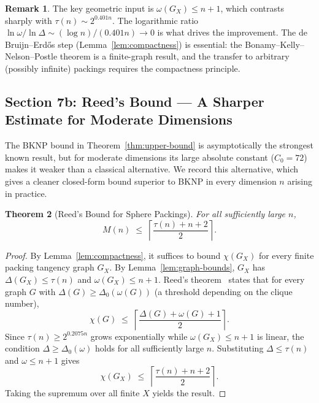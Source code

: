 \documentclass{article}
\newtheorem{theorem}{Theorem}[section]
\theoremstyle{definition}
\newtheorem{remark}[theorem]{Remark}
\begin{document}
\begin{remark}
The key geometric input is $\omega(G_X)\le n+1$, which contrasts sharply with $\tau(n)\sim 2^{0.401n}$.  The logarithmic ratio $\ln\omega/\ln\Delta\sim (\log n)/(0.401n)\to 0$ is what drives the improvement.  The de Bruijn--Erd\H{o}s step (Lemma~\ref{lem:compactness}) is essential: the Bonamy--Kelly--Nelson--Postle theorem is a finite-graph result, and the transfer to arbitrary (possibly infinite) packings requires the compactness principle.
\end{remark}

\subsection*{Section 7b: Reed's Bound — A Sharper Estimate for Moderate Dimensions}

The BKNP bound in Theorem~\ref{thm:upper-bound} is asymptotically the strongest known result, but for moderate dimensions its large absolute constant ($C_0 = 72$) makes it weaker than a classical alternative.  We record this alternative, which gives a cleaner closed-form bound superior to BKNP in every dimension $n$ arising in practice.

\begin{theorem}[Reed's Bound for Sphere Packings]\label{thm:reed}
For all sufficiently large $n$,
\[
  M(n) \;\le\; \left\lceil\frac{\tau(n)+n+2}{2}\right\rceil.
\]
\end{theorem}

\begin{proof}
By Lemma~\ref{lem:compactness}, it suffices to bound $\chi(G_X)$ for every finite packing tangency graph $G_X$.  By Lemma~\ref{lem:graph-bounds}, $G_X$ has $\Delta(G_X)\le\tau(n)$ and $\omega(G_X)\le n+1$.  Reed's theorem~\cite{Reed1998} states that for every graph $G$ with $\Delta(G)\ge\Delta_0(\omega(G))$ (a threshold depending on the clique number),
\[
  \chi(G)\;\le\;\left\lceil\frac{\Delta(G)+\omega(G)+1}{2}\right\rceil.
\]
Since $\tau(n)\ge 2^{0.2075n}$ grows exponentially while $\omega(G_X)\le n+1$ is linear, the condition $\Delta\ge\Delta_0(\omega)$ holds for all sufficiently large $n$.  Substituting $\Delta\le\tau(n)$ and $\omega\le n+1$ gives
\[
  \chi(G_X)\;\le\;\left\lceil\frac{\tau(n)+n+2}{2}\right\rceil.
\]
Taking the supremum over all finite $X$ yields the result.
\end{proof}
\end{document}
